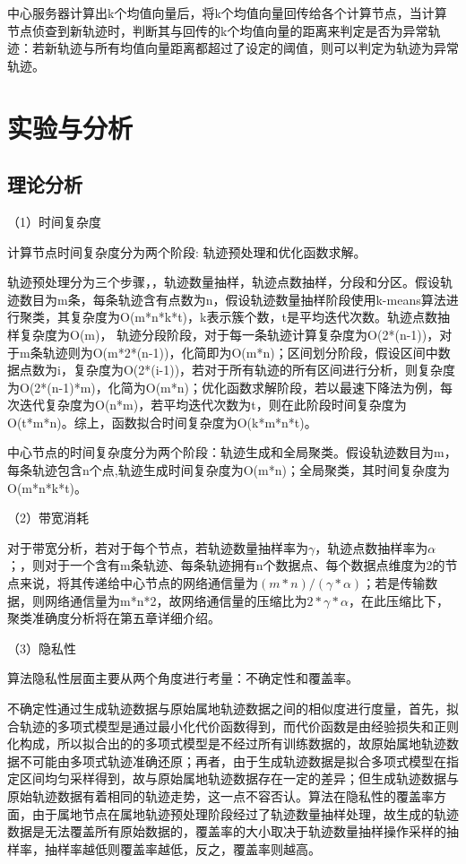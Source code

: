中心服务器计算出k个均值向量后，将k个均值向量回传给各个计算节点，当计算节点侦查到新轨迹时，判断其与回传的k个均值向量的距离来判定是否为异常轨迹：若新轨迹与所有均值向量距离都超过了设定的阈值，则可以判定为轨迹为异常轨迹。


\section{实验与分析}

\subsection{理论分析}

（1）时间复杂度

计算节点时间复杂度分为两个阶段: 轨迹预处理和优化函数求解。

轨迹预处理分为三个步骤，，轨迹数量抽样，轨迹点数抽样，分段和分区。假设轨迹数目为m条，每条轨迹含有点数为n，假设轨迹数量抽样阶段使用k-means算法进行聚类，其复杂度为O(m*n*k*t)，k表示簇个数，t是平均迭代次数。轨迹点数抽样复杂度为O(m)，
轨迹分段阶段，对于每一条轨迹计算复杂度为O(2*(n-1))，对于m条轨迹则为O(m*2*(n-1))，化简即为O(m*n)；区间划分阶段，假设区间中数据点数为i，复杂度为O(2*(i-1))，若对于所有轨迹的所有区间进行分析，则复杂度为O(2*(n-1)*m)，化简为O(m*n)；优化函数求解阶段，若以最速下降法为例，每次迭代复杂度为O(n*m)，若平均迭代次数为t，则在此阶段时间复杂度为O(t*m*n)。综上，函数拟合时间复杂度为O(k*m*n*t)。

中心节点的时间复杂度分为两个阶段：轨迹生成和全局聚类。假设轨迹数目为m，每条轨迹包含n个点,轨迹生成时间复杂度为O(m*n)；全局聚类，其时间复杂度为O(m*n*k*t)。

（2）带宽消耗

对于带宽分析，若对于每个节点，若轨迹数量抽样率为$\gamma$，轨迹点数抽样率为$\alpha$；，则对于一个含有m条轨迹、每条轨迹拥有n个数据点、每个数据点维度为2的节点来说，将其传递给中心节点的网络通信量为$(m*n)/(\gamma*\alpha)$；若是传输数据，则网络通信量为m*n*2，故网络通信量的压缩比为$2*\gamma*\alpha$，在此压缩比下，聚类准确度分析将在第五章详细介绍。

（3）隐私性

算法隐私性层面主要从两个角度进行考量：不确定性和覆盖率。

不确定性通过生成轨迹数据与原始属地轨迹数据之间的相似度进行度量，首先，拟合轨迹的多项式模型是通过最小化代价函数得到，而代价函数是由经验损失和正则化构成，所以拟合出的的多项式模型是不经过所有训练数据的，故原始属地轨迹数据不可能由多项式轨迹准确还原；再者，由于生成轨迹数据是拟合多项式模型在指定区间均匀采样得到，故与原始属地轨迹数据存在一定的差异；但生成轨迹数据与原始轨迹数据有着相同的轨迹走势，这一点不容否认。算法在隐私性的覆盖率方面，由于属地节点在属地轨迹预处理阶段经过了轨迹数量抽样处理，故生成的轨迹数据是无法覆盖所有原始数据的，覆盖率的大小取决于轨迹数量抽样操作采样的抽样率，抽样率越低则覆盖率越低，反之，覆盖率则越高。

